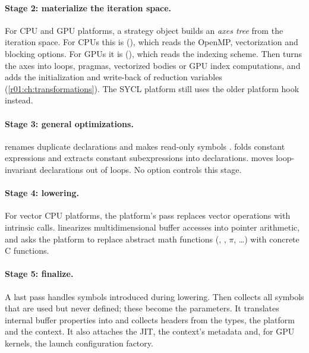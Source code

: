 \paragraph{Stage 2: materialize the iteration space.}
For CPU and GPU platforms, a strategy object builds an \emph{axes tree} from the
iteration space. For CPUs this is 
(), which reads the OpenMP, vectorization and
blocking options. For GPUs it is 
(), which reads the indexing scheme. Then
 turns the axes into loops, pragmas, vectorized bodies or GPU index
computations, and  adds the initialization and write-back of
reduction variables (\cref{r01:ch:transformations}). The SYCL platform still uses the older
platform hook  instead.

\paragraph{Stage 3: general optimizations.}
 renames duplicate declarations and makes read-only symbols
.  folds constant expressions and extracts constant
subexpressions into  declarations. 
moves loop-invariant declarations out of loops. No option controls this stage.

\paragraph{Stage 4: lowering.}
For vector CPU platforms, the platform's  pass replaces vector
operations with intrinsic calls.  linearizes multidimensional buffer
accesses into pointer arithmetic, and  asks the platform to replace
abstract math functions (, , $\pi$, \dots) with concrete C
functions.

\paragraph{Stage 5: finalize.}
A last  pass handles symbols introduced during lowering. Then
 collects all symbols that are used but never defined; these become
the parameters. It translates internal buffer properties into  and
collects headers from the types, the platform and the context. It also attaches the JIT,
the context's metadata and, for GPU kernels, the launch configuration factory.

